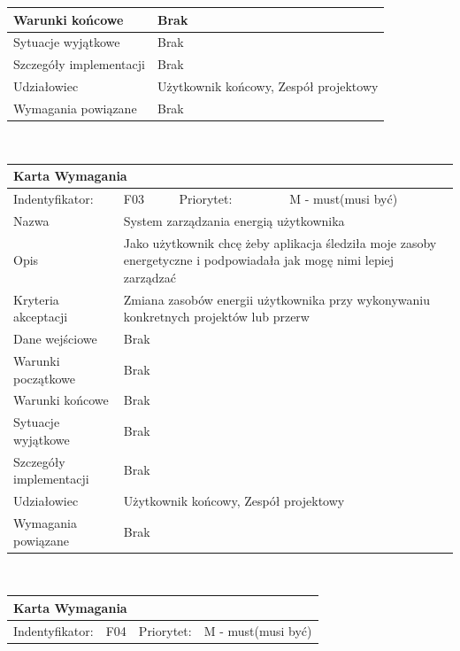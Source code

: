 \documentclass[a4paper,11pt]{report}
\begin{document}
\begin{itemize}
\begin{itemize}
\begin{tabular}{|p{3cm}|p{2cm}|p{2cm}|p{6cm}|}
		\hline
		Warunki końcowe & \multicolumn{3}{|p{10 cm}|}{Brak}\\
		\hline
		Sytuacje wyjątkowe & \multicolumn{3}{|p{10 cm}|}{Brak}\\
		\hline
		Szczegóły implementacji & \multicolumn{3}{|p{10 cm}|}{Brak}\\
		\hline
		Udziałowiec & \multicolumn{3}{|p{10 cm}|}{Użytkownik końcowy, Zespół projektowy}\\
		\hline
		Wymagania powiązane & \multicolumn{3}{|p{10 cm}|}{Brak}\\
		\hline
		\end{tabular}\\
		\begin{tabular}{|p{3cm}|p{2cm}|p{2cm}|p{6cm}|}
		\hline
		\multicolumn{4}{|p{12 cm}|}{Karta Wymagania}\\
		\hline
		Indentyfikator: & F03 & Priorytet: & M - must(musi być)\\
		\hline
		Nazwa & \multicolumn{3}{|p{10 cm}|}{System zarządzania energią  użytkownika}\\
		\hline
		Opis & \multicolumn{3}{|p{10 cm}|}{Jako użytkownik chcę żeby aplikacja śledziła moje zasoby energetyczne i podpowiadała jak mogę nimi lepiej zarządzać}\\
		\hline
		Kryteria akceptacji & \multicolumn{3}{|p{10 cm}|}{Zmiana zasobów energii użytkownika przy wykonywaniu konkretnych projektów lub przerw}\\
		\hline
		Dane wejściowe & \multicolumn{3}{|p{10 cm}|}{Brak}\\
		\hline
		Warunki początkowe & \multicolumn{3}{|p{10 cm}|}{Brak}\\
		\hline
		Warunki końcowe & \multicolumn{3}{|p{10 cm}|}{Brak}\\
		\hline
		Sytuacje wyjątkowe & \multicolumn{3}{|p{10 cm}|}{Brak}\\
		\hline
		Szczegóły implementacji & \multicolumn{3}{|p{10 cm}|}{Brak}\\
		\hline
		Udziałowiec & \multicolumn{3}{|p{10 cm}|}{Użytkownik końcowy, Zespół projektowy}\\
		\hline
		Wymagania powiązane & \multicolumn{3}{|p{10 cm}|}{Brak}\\
		\hline
		\end{tabular}\\
		\begin{tabular}{|p{3cm}|p{2cm}|p{2cm}|p{6cm}|}
		\hline
		\multicolumn{4}{|p{12 cm}|}{Karta Wymagania}\\
		\hline
		Indentyfikator: & F04 & Priorytet: & M - must(musi być)\\

\end{tabular}
\end{itemize}
\end{itemize}
\end{document}
